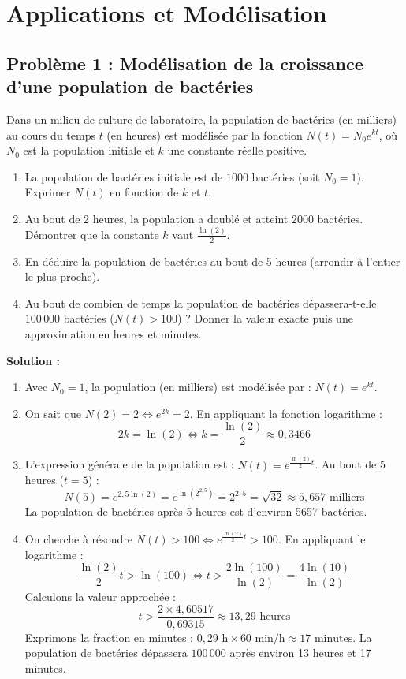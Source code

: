 \section{Applications et Modélisation}

\subsection*{Problème 1 : Modélisation de la croissance d'une population de bactéries}
Dans un milieu de culture de laboratoire, la population de bactéries (en milliers) au cours du temps $t$ (en heures) est modélisée par la fonction $N(t) = N_0 e^{kt}$, où $N_0$ est la population initiale et $k$ une constante réelle positive.
\begin{enumerate}
    \item La population de bactéries initiale est de $1000$ bactéries (soit $N_0 = 1$). Exprimer $N(t)$ en fonction de $k$ et $t$.
    \item Au bout de 2 heures, la population a doublé et atteint $2000$ bactéries. Démontrer que la constante $k$ vaut $\frac{\ln(2)}{2}$.
    \item En déduire la population de bactéries au bout de 5 heures (arrondir à l'entier le plus proche).
    \item Au bout de combien de temps la population de bactéries dépassera-t-elle $100\,000$ bactéries ($N(t) > 100$) ? Donner la valeur exacte puis une approximation en heures et minutes.
\end{enumerate}

\textbf{Solution :}
\begin{enumerate}
    \item Avec $N_0 = 1$, la population (en milliers) est modélisée par : $N(t) = e^{kt}$.
    
    \item On sait que $N(2) = 2 \iff e^{2k} = 2$.
    En appliquant la fonction logarithme :
    \[
    2k = \ln(2) \iff k = \frac{\ln(2)}{2} \approx 0,3466
    \]
    
    \item L'expression générale de la population est : $N(t) = e^{\frac{\ln(2)}{2} t}$.
    Au bout de 5 heures ($t = 5$) :
    \[
    N(5) = e^{2,5 \ln(2)} = e^{\ln(2^{2,5})} = 2^{2,5} = \sqrt{32} \approx 5,657 \text{ milliers}
    \]
    La population de bactéries après 5 heures est d'environ 5657 bactéries.
    
    \item On cherche à résoudre $N(t) > 100 \iff e^{\frac{\ln(2)}{2} t} > 100$.
    En appliquant le logarithme :
    \[
    \frac{\ln(2)}{2} t > \ln(100) \iff t > \frac{2 \ln(100)}{\ln(2)} = \frac{4 \ln(10)}{\ln(2)}
    \]
    Calculons la valeur approchée :
    \[
    t > \frac{2 \times 4,60517}{0,69315} \approx 13,29 \text{ heures}
    \]
    Exprimons la fraction en minutes : $0,29 \text{ h} \times 60 \text{ min/h} \approx 17 \text{ minutes}$.
    La population de bactéries dépassera $100\,000$ après environ 13 heures et 17 minutes.
\end{enumerate}

